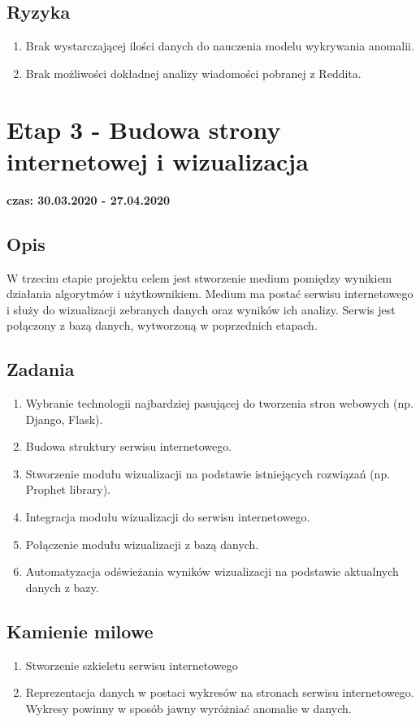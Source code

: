 \documentclass[a4paper,11pt, notitlepage ]{article}
\begin{document}
\subsection{Ryzyka}
\begin{enumerate}
    \item Brak wystarczającej ilości danych do nauczenia modelu wykrywania anomalii.
    \item Brak możliwości dokładnej analizy wiadomości pobranej z Reddita.

\end{enumerate}
\section{Etap 3 - Budowa strony internetowej i wizualizacja}
\textbf{czas: 30.03.2020 - 27.04.2020}

\subsection{Opis}
W trzecim etapie projektu celem jest stworzenie medium pomiędzy wynikiem działania algorytmów i użytkownikiem. 
Medium ma postać serwisu internetowego i służy do wizualizacji zebranych danych oraz wyników ich analizy.
Serwis jest połączony z bazą danych, wytworzoną w poprzednich etapach.

\subsection{Zadania}
\begin{enumerate}
    \item Wybranie technologii najbardziej pasującej do tworzenia stron webowych (np. Django, Flask).
    \item Budowa struktury serwisu internetowego.
    \item Stworzenie modułu wizualizacji na podstawie istniejących rozwiązań (np. Prophet library).
    \item Integracja modułu wizualizacji do serwisu internetowego.
    \item Połączenie modułu wizualizacji z bazą danych.
    \item Automatyzacja odświeżania wyników wizualizacji na podstawie aktualnych danych z bazy.
\end{enumerate}

\subsection{Kamienie milowe}
\begin{enumerate}
    \item Stworzenie szkieletu serwisu internetowego
    \item Reprezentacja danych w postaci wykresów na stronach serwisu internetowego. Wykresy powinny w sposób jawny wyróżniać anomalie w danych.
\end{enumerate}
\end{document}
